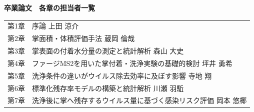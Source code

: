 \documentclass[
  a4paper,
  12pt,
  twoside,
  openright
]{report}
\begin{document}
\begin{center}
\vspace*{2cm}

{\Large\bf 卒業論文　各章の担当者一覧}

\vspace{2cm}

\begin{tabular}{ll}
第1章 & 序論 \quad 上田 涼介 \\[0.8em]
第2章 & 掌面積・体積評価手法 \quad 蔵岡 倫哉 \\[0.8em]
第3章 & 掌表面の付着水分量の測定と統計解析 \quad 森山 大史 \\[0.8em]
第4章 & ファージMS2を用いた掌付着・洗浄実験の基礎的検討 \quad 坪井 勇希 \\[0.8em]
第5章 & 洗浄条件の違いがウイルス除去効率に及ぼす影響 \quad 寺地 翔 \\[0.8em]
第6章 & 標準化残存率モデルの構築と統計解析 \quad 川瀬 羽駈 \\[0.8em]
第7章 & 洗浄後に掌へ残存するウイルス量に基づく感染リスク評価 \quad 岡本 悠椰
\end{tabular}

\vfill
\end{center}

\clearpage



\tableofcontents
\cleardoublepage


\cleardoublepage
{}
\setcounter{page}{1}





 



\end{document}
